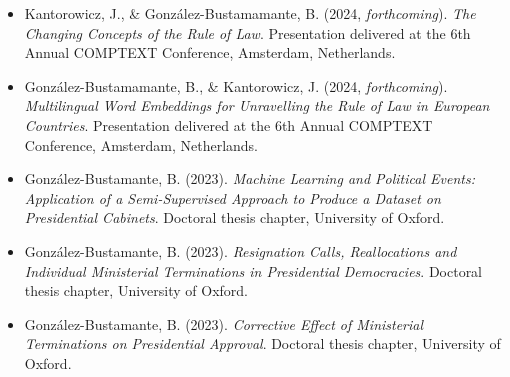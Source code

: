 





\begin{publications}

\begin{itemize}

\item{Kantorowicz, J., \& González-Bustamamante, B. (2024, {\itshape forthcoming}). {\itshape The Changing Concepts of the Rule of Law}. Presentation delivered at the 6th Annual COMPTEXT Conference, Amsterdam, Netherlands.}\vspace{1mm}

\item{González-Bustamamante, B., \& Kantorowicz, J. (2024, {\itshape forthcoming}). {\itshape Multilingual Word Embeddings for Unravelling the Rule of Law in European Countries}. Presentation delivered at the 6th Annual COMPTEXT Conference, Amsterdam, Netherlands.}\vspace{1mm}

\item{González-Bustamante, B. (2023). {\itshape Machine Learning and Political Events: Application of a Semi-Supervised Approach to Produce a Dataset on Presidential Cabinets}. Doctoral thesis chapter, University of Oxford.}\vspace{1mm}

\item{González-Bustamante, B. (2023). {\itshape Resignation Calls, Reallocations and Individual Ministerial Terminations in Presidential Democracies}. Doctoral thesis chapter, University of Oxford.}\vspace{1mm}

\item{González-Bustamante, B. (2023). {\itshape Corrective Effect of Ministerial Terminations on Presidential Approval}. Doctoral thesis chapter, University of Oxford.}\vspace{1mm}

\end{itemize}

\end{publications}


